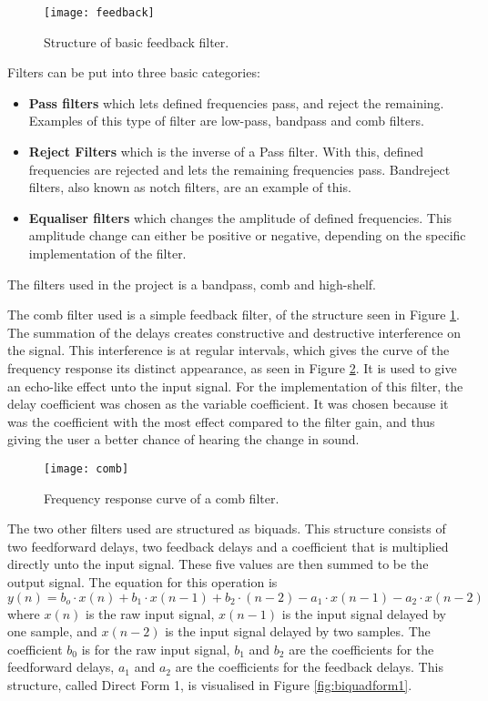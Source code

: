 \begin{figure}
\centering
\texttt{[image: feedback]}
\caption{Structure of basic feedback filter.}
\label{fig:feedback}
\end{figure}

Filters can be put into three basic categories:
\begin{itemize}
\item \textbf{Pass filters} which lets defined frequencies pass, and reject the remaining. Examples of this type of filter are low-pass, bandpass and comb filters.
\item \textbf{Reject Filters} which is the inverse of a Pass filter. With this, defined frequencies are rejected and lets the remaining frequencies pass. Bandreject filters, also known as notch filters, are an example of this.
\item \textbf{Equaliser filters} which changes the amplitude of defined frequencies. This amplitude change can either be positive or negative, depending on the specific implementation of the filter. 
\end{itemize}

The filters used in the project is a bandpass, comb and high-shelf.

The comb filter used is a simple feedback filter, of the structure seen in Figure \ref{fig:feedback}. The summation of the delays creates constructive and destructive interference on the signal. This interference is at regular intervals, which gives the curve of the frequency response its distinct appearance, as seen in Figure \ref{fig:comb}. It is used to give an echo-like effect unto the input signal. For the implementation of this filter, the delay coefficient was chosen as the variable coefficient. It was chosen because it was the coefficient with the most effect compared to the filter gain, and thus giving the user a better chance of hearing the change in sound.

\begin{figure}
\centering
\texttt{[image: comb]}
\caption{Frequency response curve of a comb filter.}
\label{fig:comb}
\end{figure}

The two other filters used are structured as biquads. This structure consists of two feedforward delays, two feedback delays and a coefficient that is multiplied directly unto the input signal. These five values are then summed to be the output signal. The equation for this operation is 
\[y(n) = b_o \cdot x(n) + b_1 \cdot x(n-1) + b_2 \cdot (n-2) - a_1 \cdot x(n-1) - a_2 \cdot x(n-2)\] \cite{Redmon2003}
where \(x(n)\) is the raw input signal, \(x(n-1)\) is the input signal delayed by one sample, and \(x(n-2)\) is the input signal delayed by two samples. The coefficient \(b_0\) is for the raw input signal, \(b_1\) and \(b_2\) are the coefficients for the feedforward delays, \(a_1\) and \(a_2\) are the coefficients for the feedback delays. This structure, called Direct Form 1, is visualised in Figure \ref{fig:biquadform1}.

